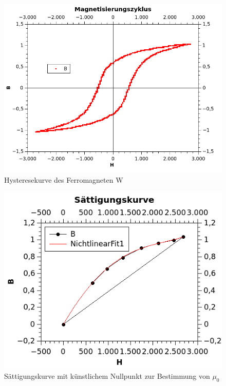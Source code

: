 \documentclass[12pt,a4paper]{article}
\begin{document}
\begin{figure}[H]
	\centering
	\includegraphics[scale=1]{./figures/Trafo_W_Hysterese.png}
	\caption{Hysteresekurve des Ferromagneten W}
	\label{fig:Trafo_W_Hysterese}
\end{figure}
\begin{figure}[H]
	\centering
	\includegraphics[scale=1]{./figures/Trafo_W_saettigung.png}
	\caption{Sättigungskurve mit künstlichem Nullpunkt zur Bestimmung von $\mu_0$}
	\label{fig:Trafo_W_saettigung}
\end{figure}
\end{document}
